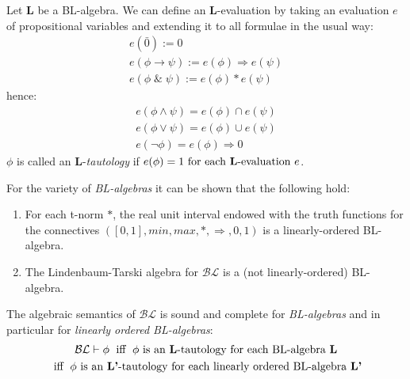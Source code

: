  \begin{definition}
 	Let \textbf{L} be a BL-algebra. We can define an \textbf{L}-evaluation by taking an evaluation $e$ of propositional variables and extending it to all formulae in the usual way:
 	\begin{gather*}
 		e(\bar{0}) := 0 \\
 		e(\phi \rightarrow \psi) := e(\phi) \Rightarrow e(\psi) \\
 		e(\phi \; \& \; \psi) := e(\phi) * e(\psi)
 	\end{gather*}
 	hence:
 	\begin{gather*}
 		e(\phi \land \psi) = e(\phi) \cap e(\psi) \\
 		e(\phi \lor \psi) = e(\phi) \cup e(\psi) \\
 		e(\neg \phi) = e(\phi) \Rightarrow 0
 	\end{gather*}
 	$\phi$ is called an \textbf{L}-\emph{tautology} if $e(\phi)=1 \text{ for each \textbf{L}-evaluation $e$}$.
 \end{definition}
 
 
 For the variety of \emph{BL-algebras} it can be shown that the following hold:
 \begin{prop}
 	\begin{enumerate}
 		\item For each t-norm $*$, the real unit interval endowed with the truth functions for the connectives $([0,1],min,max,*,\Rightarrow,0,1)$ is a linearly-ordered BL-algebra.
 		\item The Lindenbaum-Tarski algebra for $\mathcal{BL}$ is a (not linearly-ordered) BL-algebra.
 	\end{enumerate}
 \end{prop}

 \begin{thm}
 	 The algebraic semantics of $\mathcal{BL}$ is sound and complete for \emph{BL-algebras} and in particular for \emph{linearly ordered BL-algebras}:
 	\begin{gather*}
 		\mathcal{BL} \vdash \phi \;\text{ iff }\;  \phi \text{ is an \textbf{L}-tautology for each BL-algebra \textbf{L}} \\ \text{ iff }\;  \phi \text{ is an \textbf{L'}-tautology for each linearly ordered BL-algebra \textbf{L'}}
 	\end{gather*}
 \end{thm}
 
